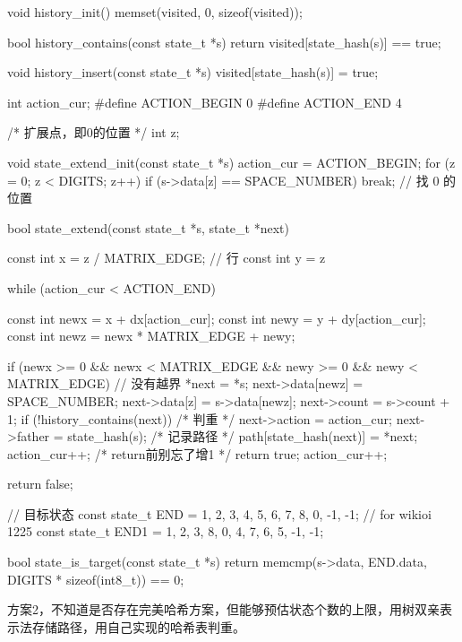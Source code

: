 \begin{Codex}[label=eight_digits_bfs.c]
void history_init() {
    memset(visited, 0, sizeof(visited));
}

bool history_contains(const state_t *s) {
    return visited[state_hash(s)] == true;
}

void history_insert(const state_t *s) {
    visited[state_hash(s)] = true;
}

int action_cur;
#define ACTION_BEGIN 0
#define ACTION_END 4

/* 扩展点，即0的位置 */
int z;

void state_extend_init(const state_t *s) {
    action_cur = ACTION_BEGIN;
    for (z = 0; z < DIGITS; z++) {
        if (s->data[z] == SPACE_NUMBER) {
            break;  // 找 0 的位置
        }
    }
}

bool state_extend(const state_t *s, state_t *next) {
    const int x = z / MATRIX_EDGE; // 行
    const int y = z %

    while (action_cur < ACTION_END) {
        const int newx = x + dx[action_cur];
        const int newy = y + dy[action_cur];
        const int newz = newx * MATRIX_EDGE + newy;

        if (newx >= 0 && newx < MATRIX_EDGE && newy >= 0 &&
                newy < MATRIX_EDGE) { // 没有越界
            *next = *s;
            next->data[newz] = SPACE_NUMBER;
            next->data[z] = s->data[newz];
            next->count = s->count + 1;
            if (!history_contains(next)) { /* 判重 */
                next->action = action_cur;
                next->father = state_hash(s);
                /* 记录路径 */
                path[state_hash(next)] = *next;
                action_cur++; /* return前别忘了增1 */
                return true;
            }
        }
        action_cur++;
    }
    return false;
}

// 目标状态
const state_t END = {{1, 2, 3, 4, 5, 6, 7, 8, 0}, -1, -1};
// for wikioi 1225
const state_t END1 = {{1, 2, 3, 8, 0, 4, 7, 6, 5}, -1, -1};

bool state_is_target(const state_t *s) {
    return memcmp(s->data, END.data, DIGITS * sizeof(int8_t)) == 0;
}
\end{Codex}

方案2，不知道是否存在完美哈希方案，但能够预估状态个数的上限，用树双亲表示法存储路径，用自己实现的哈希表判重。


